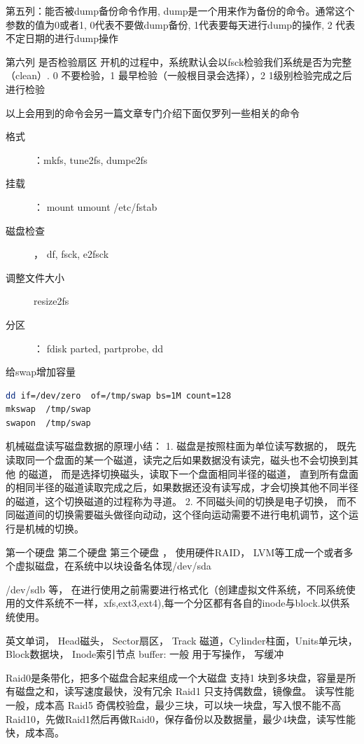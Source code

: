 第五列：能否被dump备份命令作用, dump是一个用来作为备份的命令。通常这个参数的值为0或者1, 0代表不要做dump备份, 1代表要每天进行dump的操作, 2 代表不定日期的进行dump操作

第六列 是否检验扇区 开机的过程中，系统默认会以fsck检验我们系统是否为完整（clean）. 0 不要检验，1 最早检验（一般根目录会选择），2 1级别检验完成之后进行检验


 以上会用到的命令会另一篇文章专门介绍下面仅罗列一些相关的命令
\begin{description}
	\item[格式]：mkfs, tune2fs, dumpe2fs
	\item[挂载]： mount umount /etc/fstab
	\item[磁盘检查]， df, fsck,  e2fsck
	\item[调整文件大小] resize2fs
	\item[分区]： fdisk parted, partprobe, dd
\end{description}


 给swap增加容量

\begin{lstlisting}[language=bash]
dd if=/dev/zero  of=/tmp/swap bs=1M count=128
mkswap  /tmp/swap
swapon  /tmp/swap
\end{lstlisting}


机械磁盘读写磁盘数据的原理小结：
1. 磁盘是按照柱面为单位读写数据的， 既先读取同一个盘面的某一个磁道，读完之后如果数据没有读完，磁头也不会切换到其他
的磁道， 而是选择切换磁头，读取下一个盘面相同半径的磁道， 直到所有盘面的相同半径的磁道读取完成之后，如果数据还没有读写成，才会切换其他不同半径的磁道，这个切换磁道的过程称为寻道。
2. 不同磁头间的切换是电子切换， 而不同磁道间的切换需要磁头做径向动动，这个径向运动需要不进行电机调节，这个运行是机械的切换。

第一个硬盘   第二个硬盘  第三个硬盘 ， 使用硬件RAID， LVM等工成一个或者多个虚拟磁盘，在系统中以块设备名体现/dev/sda

/dev/sdb  等， 在进行使用之前需要进行格式化（创建虚拟文件系统，不同系统使用的文件系统不一样，xfs,ext3,ext4),每一个分区都有各自的inode与block.以供系统使用。

英文单词， Head磁头， Sector扇区， Track 磁道，Cylinder柱面，Units单元块， Block数据块， Inode索引节点
buffer: 一般 用于写操作， 写缓冲

Raid0是条带化，把多个磁盘合起来组成一个大磁盘 支持1 块到多块盘，容量是所有磁盘之和，读写速度最快，没有冗余
Raid1 只支持偶数盘，镜像盘。 读写性能一般，成本高
Raid5 奇偶校验盘，最少三块，可以块一块盘，写入恨不能不高
Raid10，先做Raid1然后再做Raid0，保存备份以及数据量，最少4块盘，读写性能快，成本高。


